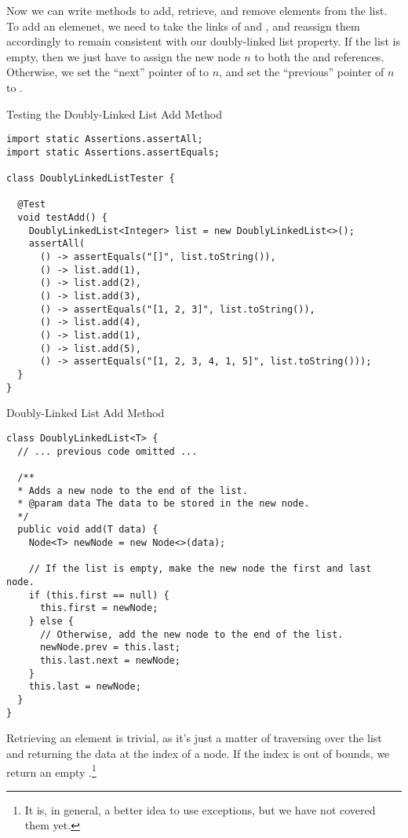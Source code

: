 Now we can write methods to add, retrieve, and remove elements from the list. To add an elemenet, we need to take the links of  and , and reassign them accordingly to remain consistent with our doubly-linked list property. If the list is empty, then we just have to assign the new node $n$ to both the  and  references. Otherwise, we set the ``next'' pointer of  to $n$, and set the ``previous'' pointer of $n$ to . 

\begin{cl}[]{Testing the Doubly-Linked List Add Method}
\begin{lstlisting}[language=MyJava]
import static Assertions.assertAll;
import static Assertions.assertEquals;

class DoublyLinkedListTester {

  @Test
  void testAdd() {
    DoublyLinkedList<Integer> list = new DoublyLinkedList<>();
    assertAll(
      () -> assertEquals("[]", list.toString()),
      () -> list.add(1),
      () -> list.add(2),
      () -> list.add(3),
      () -> assertEquals("[1, 2, 3]", list.toString()),
      () -> list.add(4),
      () -> list.add(1),
      () -> list.add(5),
      () -> assertEquals("[1, 2, 3, 4, 1, 5]", list.toString()));
  }
}
\end{lstlisting}
\end{cl}

\begin{cl}[]{Doubly-Linked List Add Method}
\begin{lstlisting}[language=MyJava]
class DoublyLinkedList<T> {
  // ... previous code omitted ...

  /**
  * Adds a new node to the end of the list.
  * @param data The data to be stored in the new node.
  */
  public void add(T data) {
    Node<T> newNode = new Node<>(data);

    // If the list is empty, make the new node the first and last node.
    if (this.first == null) {
      this.first = newNode;
    } else {
      // Otherwise, add the new node to the end of the list.
      newNode.prev = this.last;
      this.last.next = newNode;
    }
    this.last = newNode;
  }
}
\end{lstlisting}
\end{cl}

Retrieving an element is trivial, as it's just a matter of traversing over the list and returning the data at the index of a node. If the index is out of bounds, we return an empty .\footnote{It is, in general, a better idea to use exceptions, but we have not covered them yet.}

